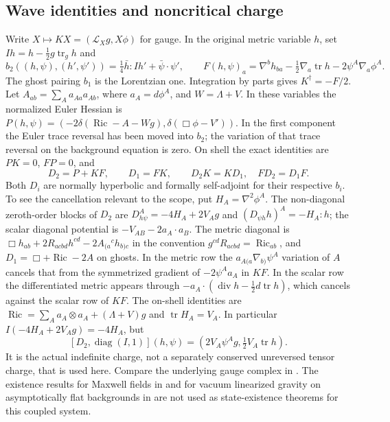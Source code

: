 \documentclass[11pt]{article}
\begin{document}
\subsection{Wave identities and noncritical charge}
Write $X\mapsto KX=(\mathcal L_X g,X\phi)$ for gauge. In the original
metric variable $h$, set $Ih=h-\frac12g\operatorname{tr}_g h$ and
\[
 b_2((h,\psi),(h',\psi'))=\tfrac14\bar h:Ih'+\bar\psi\cdot\psi',
 \qquad
 F(h,\psi)_a=\nabla^b h_{ba}-\tfrac12\nabla_a\operatorname{tr}h
       -2\psi^A\nabla_a\phi^A .
\]
The ghost pairing $b_1$ is the Lorentzian one. Integration by parts gives
$K^\dagger=-F/2$. Let $A_{ab}=\sum_A a_{Aa}a_{Ab}$, where $a_A=d\phi^A$, and
$W=\Lambda+V$. In these variables the normalized Euler Hessian is
$P(h,\psi)=(-2\delta(\operatorname{Ric}-A-Wg),
\delta(\Box\phi-V'))$. In the first component the Euler trace
reversal has been moved into $b_2$; the variation of that trace
reversal on the background equation is zero. On shell the exact identities
are $PK=0$, $FP=0$, and
\[
 D_2=P+KF,\qquad D_1=FK,\qquad
 D_2K=KD_1,\quad FD_2=D_1F .
\]
Both $D_i$ are normally hyperbolic and formally self-adjoint for their
respective $b_i$. To see the cancellation relevant to the scope, put
$H_A=\nabla^2\phi^A$. The non-diagonal zeroth-order
blocks of $D_2$ are $D_{h\psi}^A=-4H_A+2V_Ag$ and
$(D_{\psi h}h)^A=-H_A:h$; the scalar diagonal potential is
$-V_{AB}-2a_A\cdot a_B$. The metric diagonal is
$\Box h_{ab}+2R_{acbd}h^{cd}-2A_{(a}{}^c h_{b)c}$ in the
convention $g^{cd}R_{acbd}=\operatorname{Ric}_{ab}$, and
$D_1=\Box+\operatorname{Ric}-2A$ on ghosts. In the metric row
the $a_{A(a}\nabla_{b)}\psi^A$ variation of $A$ cancels that
from the symmetrized gradient of $-2\psi^Aa_A$ in $KF$.
In the scalar row the differentiated metric appears through
$-a_A\cdot(\operatorname{div} h-\tfrac12d\operatorname{tr}h)$,
which cancels against the scalar row of $KF$. The on-shell identities are
$\operatorname{Ric}=\sum_A a_A\otimes a_A+(\Lambda+V)g$ and
$\operatorname{tr} H_A=V_A$. In particular
$I(-4H_A+2V_Ag)=-4H_A$, but
\[
 [D_2,\operatorname{diag}(I,1)](h,\psi)
       =(2V_A\psi^Ag,\tfrac12V_A\operatorname{tr}h).
\]
It is the actual indefinite charge, not a separately conserved
unreversed tensor charge, that is used here. Compare the underlying
gauge complex in \cite{hack,hackschenkel,schmid}. The existence
results for Maxwell fields in \cite{schmid} and for vacuum
linearized gravity on asymptotically flat backgrounds in \cite{gmw}
are not used as state-existence theorems for this coupled system.
\end{document}
